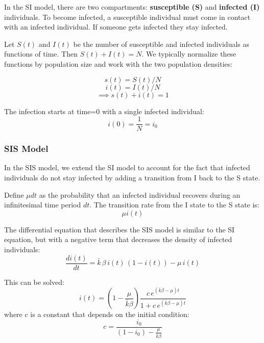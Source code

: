 \documentclass[11pt]{scrartcl} %
\begin{document}
In the SI model, there are two compartments: \textbf{susceptible (S)} and \textbf{infected (I)} individuals. To become infected, a susceptible individual must come in contact with an infected individual. If someone gets infected they stay infected.

Let $S(t)$ and $I(t)$ be the number of susceptible and infected individuals as functions of time. Then $S(t) + I(t) = N$. We typically normalize these functions by population size and work with the two population densities: 

	\[ s(t) = S(t)/N \]
	\[ i(t) = I(t)/N \]
	\[ \implies s(t) + i(t) = 1 \]

The infection starts at time=0 with a single infected individual:
\[i(0) = \frac{1}{N} = i_0 \]


\subsubsection{SIS Model}
In the SIS model, we extend the SI model to account for the fact that infected individuals do not stay infected by adding a transition from I back to the S state. 

Define $\mu dt$ as the probability that an infected individual recovers during an infinitesimal time period $dt$. The transition rate from the I state to the S state is:
\[ \mu i(t) \]

The differential equation that describes the SIS model is similar to the SI equation, but with a negative term that decreases the density of infected individuals:
\[ \frac{di(t)}{dt} = \bar{k} \, \beta \, i(t) \, (1-i(t)) - \mu \, i(t) \]

This can be solved: 
\[ i(t) = (1-\frac{\mu}{\bar{k} \beta}) \frac{c \, e^{(\bar{k}\beta-\mu)t}}{1 + c \, e^{(\bar{k} \beta-\mu)t} } \]
where c is a constant that depends on the initial condition:
\[ c= \frac{i_0}{(1-i_0)-\frac{\mu}{\bar{k} \beta}} \] 
\end{document}
